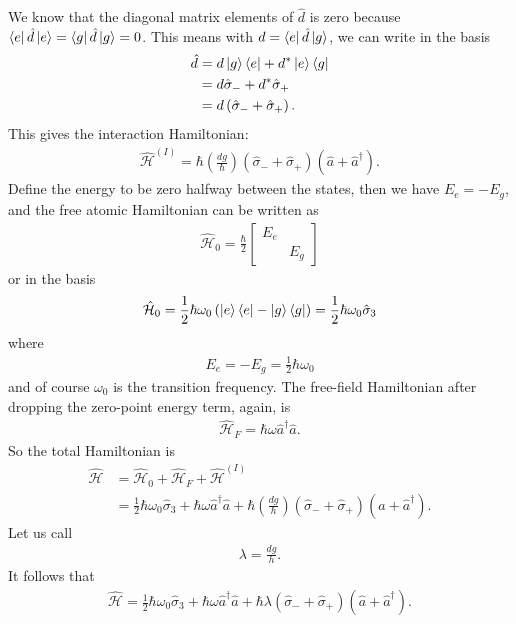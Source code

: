 \documentclass{book}
\theoremstyle{definition}
\newcommand{\ham}{\mathcal{H}}
\newcommand{\f}[2]{\frac{#1}{#2}}
\newcommand{\lp}{\left(}
\newcommand{\rp}{\right)}
\begin{document}
We know that the diagonal matrix elements of $\hat{d}$ is zero because $\bra{e}\hat{d}\ket{e} = \bra{g}\hat{d}\ket{g} = 0$. This means with $d = \bra{e}\hat{d}\ket{g}$, we can write in the basis
\begin{align}
\hat{d} &= d\ket{g}\bra{e} + d^*\ket{e}\bra{g}\\
&= d\hat{\sigma}_- + d^*\hat{\sigma}_+\\
&= d\lp \hat{\sigma}_- + \hat{\sigma}_+ \rp.
\end{align}
This gives the interaction Hamiltonian:
\begin{align}
\hat{\ham}^{(I)} = \hbar \lp \f{dg}{\hbar} \rp \lp \hat{\sigma}_- + \hat{\sigma}_+ \rp \lp \hat{a} + \hat{a}^\dagger \rp. 
\end{align}
Define the energy to be zero halfway between the states, then we have $E_e = -E_g$, and the free atomic Hamiltonian can be written as
\begin{align}
\hat{\ham}_0 = \f{\hbar}{2}\begin{bmatrix}
E_e & \\ & E_g
\end{bmatrix} 
\end{align}
or in the basis
\begin{align}
\hat{\ham}_0 = \f{1}{2}\hbar\omega_0 \lp \ket{e}\bra{e} - \ket{g}\bra{g} \rp = \f{1}{2}\hbar\omega_0 \hat{\sigma}_3 
\end{align}
where 
\begin{align}
E_e = -E_g = \f{1}{2}\hbar\omega_0
\end{align}
and of course $\omega_0$ is the transition frequency. The free-field Hamiltonian after dropping the zero-point energy term, again, is
\begin{align}
\hat{\ham}_F = \hbar\omega\hat{a}^\dagger\hat{a}.
\end{align}
So the total Hamiltonian is
\begin{align}
\hat{\ham} &= \hat{\ham}_0 + \hat{\ham}_F + \hat{\ham}^{(I)}\\
&= \f{1}{2}\hbar\omega_0 \hat{\sigma}_3  + \hbar\omega\hat{a}^\dagger\hat{a} + \hbar \lp \f{dg}{\hbar} \rp \lp \hat{\sigma}_- + \hat{\sigma}_+ \rp \lp \hat{a} + \hat{a}^\dagger \rp.
\end{align}
Let us call
\begin{align}
\lambda = \f{dg}{h}.
\end{align}
It follows that
\begin{align}
\hat{\ham} = \f{1}{2}\hbar\omega_0 \hat{\sigma}_3  + \hbar\omega\hat{a}^\dagger\hat{a} + \hbar \lambda\lp  \hat{\sigma}_- + \hat{\sigma}_+ \rp \lp \hat{a} + \hat{a}^\dagger \rp.
\end{align}
\end{document}
